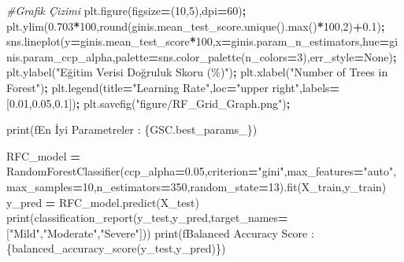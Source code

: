 \documentclass[12pt,twoside]{deuthesis}
\newenvironment{Shaded}{\begin{snugshade}}{\end{snugshade}}
\newcommand{\BuiltInTok}[1]{#1}
\newcommand{\CommentTok}[1]{\textcolor[rgb]{0.56,0.35,0.01}{\textit{#1}}}
\newcommand{\DecValTok}[1]{\textcolor[rgb]{0.00,0.00,0.81}{#1}}
\newcommand{\FloatTok}[1]{\textcolor[rgb]{0.00,0.00,0.81}{#1}}
\newcommand{\NormalTok}[1]{#1}
\newcommand{\OperatorTok}[1]{\textcolor[rgb]{0.81,0.36,0.00}{\textbf{#1}}}
\newcommand{\SpecialCharTok}[1]{\textcolor[rgb]{0.00,0.00,0.00}{#1}}
\newcommand{\SpecialStringTok}[1]{\textcolor[rgb]{0.31,0.60,0.02}{#1}}
\newcommand{\StringTok}[1]{\textcolor[rgb]{0.31,0.60,0.02}{#1}}
\newcommand{\VariableTok}[1]{\textcolor[rgb]{0.00,0.00,0.00}{#1}}
\begin{document}
\begin{Shaded}
\begin{Highlighting}[]
\CommentTok{\#Grafik Çizimi}
\NormalTok{plt.figure(figsize}\OperatorTok{=}\NormalTok{(}\DecValTok{10}\NormalTok{,}\DecValTok{5}\NormalTok{),dpi}\OperatorTok{=}\DecValTok{60}\NormalTok{)}\OperatorTok{;}
\NormalTok{plt.ylim(}\FloatTok{0.703}\OperatorTok{*}\DecValTok{100}\NormalTok{,}\BuiltInTok{round}\NormalTok{(ginis.mean\_test\_score.unique().}\BuiltInTok{max}\NormalTok{()}\OperatorTok{*}\DecValTok{100}\NormalTok{,}\DecValTok{2}\NormalTok{)}\OperatorTok{+}\FloatTok{0.1}\NormalTok{)}\OperatorTok{;}
\NormalTok{sns.lineplot(y}\OperatorTok{=}\NormalTok{ginis.mean\_test\_score}\OperatorTok{*}\DecValTok{100}\NormalTok{,x}\OperatorTok{=}\NormalTok{ginis.param\_n\_estimators,hue}\OperatorTok{=}\NormalTok{ginis.param\_ccp\_alpha,palette}\OperatorTok{=}\NormalTok{sns.color\_palette(n\_colors}\OperatorTok{=}\DecValTok{3}\NormalTok{),err\_style}\OperatorTok{=}\VariableTok{None}\NormalTok{)}\OperatorTok{;}
\NormalTok{plt.ylabel(}\StringTok{"Eğitim Verisi Doğruluk Skoru (\%)"}\NormalTok{)}\OperatorTok{;}
\NormalTok{plt.xlabel(}\StringTok{"Number of Trees in Forest"}\NormalTok{)}\OperatorTok{;}
\NormalTok{plt.legend(title}\OperatorTok{=}\StringTok{"Learning Rate"}\NormalTok{,loc}\OperatorTok{=}\StringTok{"upper right"}\NormalTok{,labels}\OperatorTok{=}\NormalTok{[}\FloatTok{0.01}\NormalTok{,}\FloatTok{0.05}\NormalTok{,}\FloatTok{0.1}\NormalTok{])}\OperatorTok{;}
\NormalTok{plt.savefig(}\StringTok{"figure/RF\_Grid\_Graph.png"}\NormalTok{)}\OperatorTok{;}
\end{Highlighting}
\end{Shaded}
\begin{Shaded}
\begin{Highlighting}[]
\BuiltInTok{print}\NormalTok{(}\SpecialStringTok{f\textquotesingle{}En İyi Parametreler : }\SpecialCharTok{\{}\NormalTok{GSC}\SpecialCharTok{.}\NormalTok{best\_params\_}\SpecialCharTok{\}}\SpecialStringTok{\textquotesingle{}}\NormalTok{)}
\end{Highlighting}
\end{Shaded}
\begin{Shaded}
\begin{Highlighting}[]
\NormalTok{RFC\_model }\OperatorTok{=}\NormalTok{ RandomForestClassifier(ccp\_alpha}\OperatorTok{=}\FloatTok{0.05}\NormalTok{,criterion}\OperatorTok{=}\StringTok{"gini"}\NormalTok{,max\_features}\OperatorTok{=}\StringTok{"auto"}\NormalTok{,}
\NormalTok{                                   max\_samples}\OperatorTok{=}\DecValTok{10}\NormalTok{,n\_estimators}\OperatorTok{=}\DecValTok{350}\NormalTok{,random\_state}\OperatorTok{=}\DecValTok{13}\NormalTok{).fit(X\_train,y\_train)}
\NormalTok{y\_pred }\OperatorTok{=}\NormalTok{ RFC\_model.predict(X\_test)}
\BuiltInTok{print}\NormalTok{(classification\_report(y\_test,y\_pred,target\_names}\OperatorTok{=}\NormalTok{[}\StringTok{"Mild"}\NormalTok{,}\StringTok{"Moderate"}\NormalTok{,}\StringTok{"Severe"}\NormalTok{]))}
\BuiltInTok{print}\NormalTok{(}\SpecialStringTok{f\textquotesingle{}Balanced Accuracy Score : }\SpecialCharTok{\{}\NormalTok{balanced\_accuracy\_score(y\_test,y\_pred)}\SpecialCharTok{\}}\SpecialStringTok{\textquotesingle{}}\NormalTok{)}
\end{Highlighting}
\end{Shaded}
\end{document}

